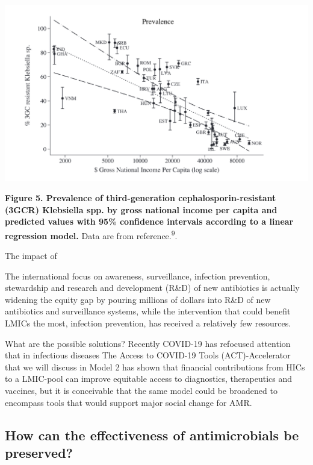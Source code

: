 \documentclass[
]{book}
\begin{document}
\includegraphics[width=8.33333in,height=\textheight]{images/gdp.png}

\textbf{Figure 5. Prevalence of third-generation cephalosporin-resistant (3GCR) Klebsiella spp. by gross national income per capita and predicted values with 95\% confidence intervals according to a linear regression model.} Data are from reference.\textsuperscript{9}.

The impact of

The international focus on awareness, surveillance, infection prevention, stewardship and research and development (R\&D) of new antibiotics is actually widening the equity gap by pouring millions of dollars into R\&D of new antibiotics and surveillance systems, while the intervention that could benefit LMICs the most, infection prevention, has received a relatively few resources.

What are the possible solutions? Recently COVID-19 has refocused attention that in infectious diseases The Access to COVID-19 Tools (ACT)-Accelerator that we will discuss in Model 2 has shown that financial contributions from HICs to a LMIC-pool can improve equitable access to diagnostics, therapeutics and vaccines, but it is conceivable that the same model could be broadened to encompass tools that would support major social change for AMR.

\hypertarget{how-can-the-effectiveness-of-antimicrobials-be-preserved}{%
\subsection*{How can the effectiveness of antimicrobials be preserved?}\label{how-can-the-effectiveness-of-antimicrobials-be-preserved}}
\end{document}
